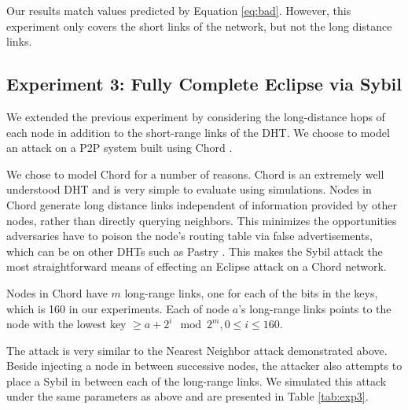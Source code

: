 \documentclass[11pt,conference]{IEEEtran}
\begin{document}
Our results match values predicted by Equation \ref{eq:bad}.
However, this experiment only covers the short links of the network, but not the long distance links.



\subsection{Experiment 3: Fully Complete Eclipse via Sybil}
\label{sec:chord}
We extended the previous experiment by considering the long-distance hops of each node in addition to the short-range links of the DHT.
We choose to model an attack on a P2P system built using Chord \cite{chord}.


We chose to model Chord for a number of reasons.
Chord is an extremely well understood DHT and is very simple to evaluate using simulations.
Nodes in Chord generate long distance links independent of information provided by other nodes, rather than directly querying neighbors.
This minimizes the opportunities adversaries have to poison the node's routing table via false advertisements, which can be on other DHTs such as Pastry \cite{pastry}. 
This makes the Sybil attack the most straightforward means of effecting an Eclipse attack on a Chord network.

Nodes in Chord have $m$ long-range links, one for each of the bits in the keys, which is 160 in our experiments.
Each of node $a$'s long-range links points to the node with the lowest key $\geq a + 2^{i} \mod 2^{m}, 0 \leq i \leq 160$.

The attack is very similar to the Nearest Neighbor attack demonstrated above.
Beside injecting a node in between successive nodes, the attacker also attempts to place a Sybil in between each of the long-range links.
We simulated this attack under the same parameters as above and are presented in Table \ref{tab:exp3}.
\end{document}
